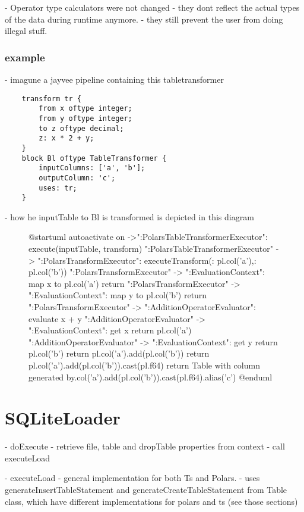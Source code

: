 - Operator type calculators were not changed
- they dont reflect the actual types of the data during runtime anymore.
- they still prevent the user from doing illegal stuff.


\subsubsection{example}
- imagune a jayvee pipeline containing this tabletransformer \
\begin{verbatim}
	transform tr {
		from x oftype integer;
		from y oftype integer;
		to z oftype decimal;
		z: x * 2 + y;
	}
	block Bl oftype TableTransformer {
		inputColumns: ['a', 'b'];
		outputColumn: 'c';
		uses: tr;
	}
\end{verbatim}
- how he inputTable to Bl is transformed is depicted in this diagram
\begin{figure}
	\begin{plantuml}
		@startuml
		autoactivate on
		->":PolarsTableTransformerExecutor": execute(inputTable, transform)
		":PolarsTableTransformerExecutor" -> ":PolarsTransformExecutor": executeTransform({\nx: pl.col('a'),\ny: pl.col('b')\n})
		":PolarsTransformExecutor" -> ":EvaluationContext": map x to pl.col('a')
		return
		":PolarsTransformExecutor" -> ":EvaluationContext": map y to pl.col('b')
		return
		":PolarsTransformExecutor" -> ":AdditionOperatorEvaluator": evaluate x + y
		":AdditionOperatorEvaluator" -> ":EvaluationContext": get x
		return pl.col('a')
		":AdditionOperatorEvaluator" -> ":EvaluationContext": get y
		return pl.col('b')
		return pl.col('a')\n.add(pl.col('b'))
		return pl.col('a')\n.add(pl.col('b'))\n.cast(pl.f64)
		return Table with column generated by\npl.col('a')\n.add(pl.col('b'))\n.cast(pl.f64)\n.alias('c')
		@enduml
	\end{plantuml}
	\caption{}
	\label{fig:uml:epr:example}
\end{figure}




\section{SQLiteLoader}
- doExecute
- retrieve file, table and dropTable properties from context
- call executeLoad

- executeLoad
- general implementation for both Ts and Polars.
- uses generateInsertTableStatement and generateCreateTableStatement from Table class, which have different implementations for polars and ts (see those sections)

